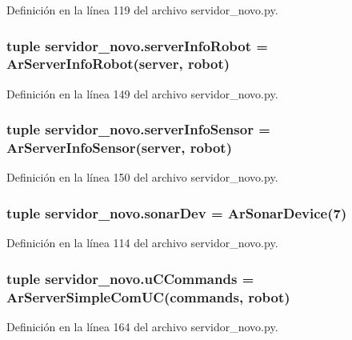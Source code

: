Definición en la línea 119 del archivo servidor\_\-novo.py.

\hypertarget{namespaceservidor__novo_aae2aad1feed83599e4783f4d39086ee6}{
\subsubsection[{serverInfoRobot}]{\setlength{\rightskip}{0pt plus 5cm}tuple {\bf servidor\_\-novo.serverInfoRobot} = ArServerInfoRobot({\bf server}, {\bf robot})}}
\label{namespaceservidor__novo_aae2aad1feed83599e4783f4d39086ee6}


Definición en la línea 149 del archivo servidor\_\-novo.py.

\hypertarget{namespaceservidor__novo_a31795a5817e65297017799e1fdbc6fdd}{
\subsubsection[{serverInfoSensor}]{\setlength{\rightskip}{0pt plus 5cm}tuple {\bf servidor\_\-novo.serverInfoSensor} = ArServerInfoSensor({\bf server}, {\bf robot})}}
\label{namespaceservidor__novo_a31795a5817e65297017799e1fdbc6fdd}


Definición en la línea 150 del archivo servidor\_\-novo.py.

\hypertarget{namespaceservidor__novo_a966ece9821b12a79fc5b83f628987f7d}{
\subsubsection[{sonarDev}]{\setlength{\rightskip}{0pt plus 5cm}tuple {\bf servidor\_\-novo.sonarDev} = ArSonarDevice(7)}}
\label{namespaceservidor__novo_a966ece9821b12a79fc5b83f628987f7d}


Definición en la línea 114 del archivo servidor\_\-novo.py.

\hypertarget{namespaceservidor__novo_a9cc0dcde8396c1ff04833e8811a1df74}{
\subsubsection[{uCCommands}]{\setlength{\rightskip}{0pt plus 5cm}tuple {\bf servidor\_\-novo.uCCommands} = ArServerSimpleComUC({\bf commands}, {\bf robot})}}
\label{namespaceservidor__novo_a9cc0dcde8396c1ff04833e8811a1df74}


Definición en la línea 164 del archivo servidor\_\-novo.py.

